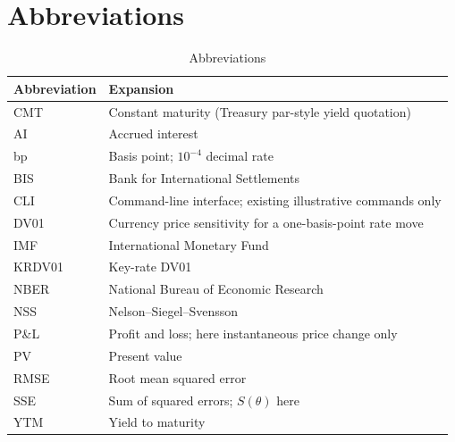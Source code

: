 \section*{Abbreviations}
\begin{longtable}{@{}L{0.18\textwidth}L{0.74\textwidth}@{}}
\caption{Abbreviations}\label{tab:abbreviations}\\
\toprule Abbreviation & Expansion\\ \midrule
CMT & Constant maturity (Treasury par-style yield quotation)\\
AI & Accrued interest\\
bp & Basis point; \(10^{-4}\) decimal rate\\
BIS & Bank for International Settlements\\
CLI & Command-line interface; existing illustrative commands only\\
DV01 & Currency price sensitivity for a one-basis-point rate move\\
IMF & International Monetary Fund\\
KRDV01 & Key-rate DV01\\
NBER & National Bureau of Economic Research\\
NSS & Nelson--Siegel--Svensson\\
P\&L & Profit and loss; here instantaneous price change only\\
PV & Present value\\
RMSE & Root mean squared error\\
SSE & Sum of squared errors; \(S(\theta)\) here\\
YTM & Yield to maturity\\
\bottomrule
\end{longtable}

